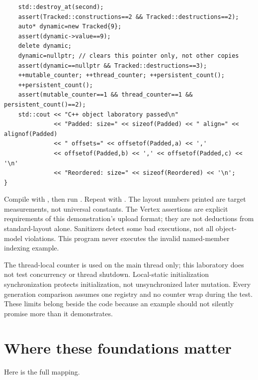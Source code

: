 \begin{verbatim}
    std::destroy_at(second);
    assert(Tracked::constructions==2 && Tracked::destructions==2);
    auto* dynamic=new Tracked{9};
    assert(dynamic->value==9);
    delete dynamic;
    dynamic=nullptr; // clears this pointer only, not other copies
    assert(dynamic==nullptr && Tracked::destructions==3);
    ++mutable_counter; ++thread_counter; ++persistent_count();
    ++persistent_count();
    assert(mutable_counter==1 && thread_counter==1 && persistent_count()==2);
    std::cout << "C++ object laboratory passed\n"
              << "Padded: size=" << sizeof(Padded) << " align=" << alignof(Padded)
              << " offsets=" << offsetof(Padded,a) << ','
              << offsetof(Padded,b) << ',' << offsetof(Padded,c) << '\n'
              << "Reordered: size=" << sizeof(Reordered) << '\n';
}
\end{verbatim}

Compile with , then run . Repeat with . The layout numbers printed are target measurements, not universal constants. The Vertex assertions are explicit requirements of this demonstration's upload format; they are not deductions from standard-layout alone. Sanitizers detect some bad executions, not all object-model violations. This program never executes the invalid named-member indexing example.

The thread-local counter is used on the main thread only; this laboratory does not test concurrency or thread shutdown. Local-static initialization synchronization protects initialization, not unsynchronized later mutation. Every generation comparison assumes one registry and no counter wrap during the test. These limits belong beside the code because an example should not silently promise more than it demonstrates.

\section{Where these foundations matter}\label{01-foundations-i-ch004-where-these-foundations-matter}

\hypertarget{01-foundations-i-ch004-where-these-foundations-matter}{}

Here is the full mapping.

